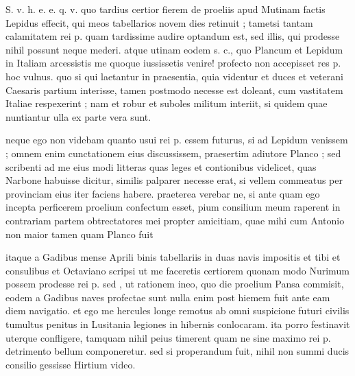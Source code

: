 


 S. v. h. e. e. q. v. quo tardius certior fierem de proeliis apud Mutinam factis Lepidus effecit, qui meos tabellarios novem dies retinuit ; tametsi tantam calamitatem rei p. quam tardissime audire optandum est, sed illis, qui prodesse nihil possunt neque mederi. atque utinam eodem s. c., quo Plancum et Lepidum in Italiam arcessistis me quoque iussissetis venire! profecto non accepisset res p. hoc vulnus. quo si qui laetantur in praesentia, quia videntur et duces et veterani Caesaris partium interisse, tamen postmodo necesse est doleant, cum vastitatem Italiae respexerint ; nam et robur et suboles militum interiit, si quidem quae nuntiantur ulla ex parte vera sunt.

 neque ego non videbam quanto usui rei p. essem futurus, si ad Lepidum venissem ; omnem enim cunctationem eius discussissem, praesertim adiutore Planco ; sed scribenti ad me eius modi litteras quas leges et contionibus videlicet, quas Narbone habuisse dicitur, similis palparer necesse erat, si vellem commeatus per provinciam eius iter faciens habere. praeterea verebar ne, si ante quam ego incepta perficerem proelium confectum esset, pium consilium meum raperent in contrariam partem obtrectatores mei propter amicitiam, quae mihi cum Antonio non maior tamen quam Planco fuit

 itaque a Gadibus mense Aprili binis tabellariis in duas navis impositis et tibi et consulibus et Octaviano scripsi ut me faceretis certiorem quonam modo Nurimum possem prodesse rei p. sed , ut rationem ineo, quo die proelium Pansa commisit, eodem a Gadibus naves profectae sunt nulla enim post hiemem fuit ante eam diem navigatio. et ego me hercules longe remotus ab omni suspicione futuri civilis tumultus penitus in Lusitania legiones in hibernis conlocaram. ita porro festinavit uterque confligere, tamquam nihil peius timerent quam ne sine maximo rei p. detrimento bellum componeretur. sed si properandum fuit, nihil non summi ducis consilio gessisse Hirtium video.


